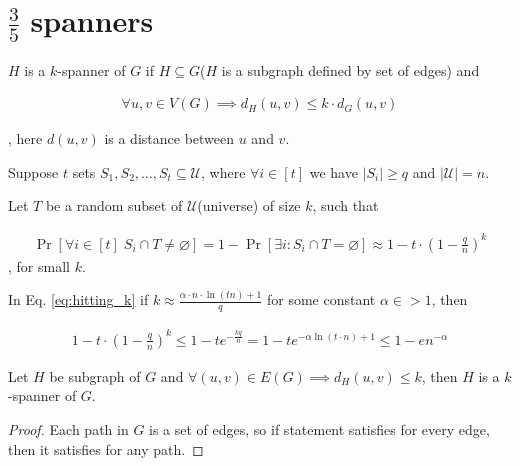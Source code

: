 \section{$\frac{3}{5}$ spanners}

\begin{df} \label{df:mul_spanner}
  $H$ is a $k$-spanner of $G$ if $H \subseteq G$($H$ is a subgraph defined by set of edges) and

  \begin{align*}
  \forall u, v \in V(G) \implies d_H(u, v) \leq k \cdot d_G(u, v)
  \end{align*}

  , here $d(u, v)$ is a distance between $u$ and $v$.
\end{df}

\begin{remrk} \label{df:hitting_sets}
	Suppose $t$ sets $S_1, S_2, \ldots, S_t \subseteq \mathcal U$, where $\forall i \in [t]$ we have $|S_i| \geq q$ and $|\mathcal U| = n$.

	Let $T$ be a random subset of $\mathcal U$(universe) of size $k$, such that

	\begin{align} \label{eq:hitting_k}
		\Pr[\forall i \in [t] \; S_i \cap T \neq \varnothing] =  1 - \Pr[\exists i \colon S_i \cap T = \varnothing] \approx 1 - t \cdot \left(1 - \frac q n\right)^{k}
	\end{align}, for small $k$.

	In Eq. \eqref{eq:hitting_k} if $k \approx \frac{\alpha \cdot n \cdot \ln (t n) + 1}{ q }$ for some constant $\alpha \in > 1$, then 

	\begin{align*}
		1 - t \cdot \left(1 - \frac q n\right)^k \leq 1 - t e^{- \frac{k q}{n}} = 1 - t e^{-\alpha \ln(t \cdot n) + 1} \leq 1 - e n^{-\alpha}
	\end{align*}

\end{remrk}

\begin{lm}[folklore]
Let $H$ be subgraph of $G$ and $\forall (u, v) \in E(G) \implies d_H(u, v) \leq k$, then $H$ is a $k$-spanner of $G$.
\end{lm}

\begin{proof}
  Each path in $G$ is a set of edges, so if statement satisfies for every edge, then it satisfies for any path.
\end{proof}



